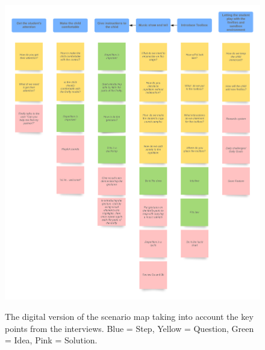 \begin{figure}[H]
    \centering
    \includegraphics[width=16cm]{figures/ScenarioMaps.png}
    \label{fig:ScenarioMap}
    \caption{The digital version of the scenario map taking into account the key points from the interviews. Blue = Step, Yellow = Question, Green = Idea, Pink = Solution.}
\end{figure}

